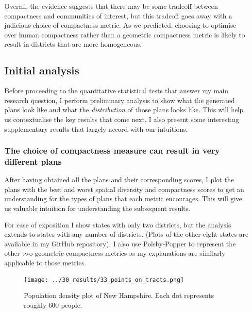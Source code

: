 \documentclass[]{article}
\begin{document}
Overall, the evidence suggests that there may be some tradeoff between
compactness and communities of interest, but this tradeoff goes away
with a judicious choice of compactness metric. As we predicted, choosing
to optimise over human compactness rather than a geometric compactness
metric is likely to result in districts that are more homogeneous.

\hypertarget{initial-analysis}{%
\subsection{Initial analysis}\label{initial-analysis}}

Before proceeding to the quantitative statistical tests that answer my
main research question, I perform preliminary analysis to show what the
generated plans look like and what the \emph{distribution} of those
plans looks like. This will help us contextualise the key results that
come next. I also present some interesting supplementary results that
largely accord with our intuitions.

\hypertarget{the-choice-of-compactness-measure-can-result-in-very-different-plans}{%
\subsubsection{The choice of compactness measure can result in very
different
plans}\label{the-choice-of-compactness-measure-can-result-in-very-different-plans}}

After having obtained all the plans and their corresponding scores, I
plot the plans with the best and worst spatial diversity and compactness
scores to get an understanding for the types of plans that each metric
encourages. This will give us valuable intuition for understanding the
subsequent results.

For ease of exposition I show states with only two districts, but the
analysis extends to states with any number of districts. (Plots of the
other eight states are available in my GitHub repository). I also use
Polsby-Popper to represent the other two geometric compactness metrics
as my explanations are similarly applicable to those metrics.

\begin{figure}
\centering
\texttt{[image: ../30\_results/33\_points\_on\_tracts.png]}
\caption{Population density plot of New Hampshire. Each dot represents
roughly 600 people. \label{nh_density}}
\end{figure}
\end{document}
